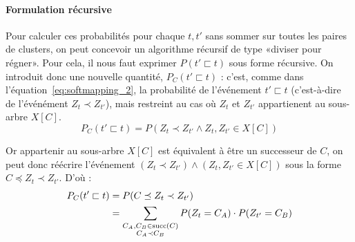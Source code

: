 \paragraph{Formulation récursive}

Pour calculer ces probabilités pour chaque $t, t'$ sans sommer sur toutes les paires de clusters, on peut concevoir un algorithme récursif de type «diviser pour régner». Pour cela, il nous faut exprimer $P(t' \sqsubset t)$ sous forme récursive. On introduit donc une nouvelle quantité,  $P_C(t' \sqsubset t)$ : c'est, comme dans l'équation~\ref{eq:softmapping_2}, la probabilité de l'événement $t' \sqsubset t$ (c'est-à-dire de l'événément $Z_t \prec Z_{t'}$), mais restreint au cas où $Z_t$ et $Z_{t'}$ appartienent au sous-arbre $X[C]$.
\begin{equation}
    P_C(t' \sqsubset t) = P(Z_t \prec Z_{t'} \land Z_t, Z_{t'} \in X[C])
\end{equation}

Or appartenir au sous-arbre $X[C]$ est équivalent à être un successeur de $C$, on peut donc réécrire l'événement $(Z_t \prec Z_{t'}) \land (Z_t, Z_{t'} \in X[C])$ sous la forme $C \preceq Z_t \prec Z_{t'}$. D'où :
\begin{align}
    P_C(t' \sqsubset t) &= P(C \preceq Z_t \prec Z_{t'}) \nonumber \\
    &= \sum_{\substack{C_A, C_B \in \operatorname{succ}(C) \\  C_A \prec C_B}} P(Z_t = C_A)\cdot P(Z_{t'} = C_B) \label{eq:proba_subsumption}
\end{align}



